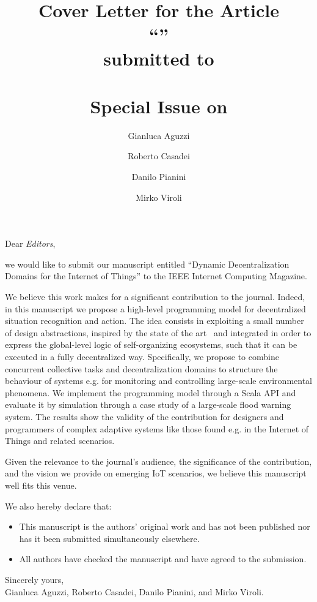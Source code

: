 \documentclass{article}
\title{Cover Letter for the Article\\
\textbf{``\theTitle''}
\\
submitted to
\\
\textbf{\thePublisher{} \theJournal{}\\ Special Issue on \theSI{}}}
\author{Gianluca Aguzzi \and Roberto Casadei \and Danilo Pianini \and Mirko Viroli}
\newcommand{\theTitle}{Dynamic Decentralization Domains for the Internet of Things}
\newcommand{\thePublisher}{IEEE}
\newcommand{\theJournal}{Internet Computing}
\begin{document}
\maketitle

Dear \emph{Editors},

we would like to submit our manuscript entitled ``\theTitle{}''
to the \thePublisher{} \theJournal{} Magazine.

We believe this work makes for a significant contribution to the journal. 
%
Indeed,
 in this manuscript 
 we propose a high-level programming model
 for decentralized situation recognition and action.
%
The idea consists 
 in exploiting a small number of 
 design abstractions,
 inspired by the state of the art~\cite{DBLP:journals/computer/BealPV15,DBLP:journals/fgcs/PianiniCVN21,DBLP:journals/eaai/CasadeiVAPD21,DBLP:journals/tetc/ScekicSVRTMD20,DBLP:journals/computer/BuresPKTH16,DBLP:journals/csur/MottolaP11}
 and integrated in order to express the global-level logic
 of self-organizing ecosystems, such that it can be executed in a fully decentralized way.
%
Specifically, we propose to combine concurrent collective tasks
 and decentralization domains
 to structure 
 the behaviour
 of systems
 e.g. for 
 monitoring and controlling
 large-scale environmental phenomena.
%
We implement the programming model 
 through a Scala API
 and evaluate it by simulation
 through a case study 
 of a large-scale flood warning system.
%
The results show the validity of the contribution for 
 designers and programmers
 of complex adaptive systems
 like those found e.g. in the Internet of Things and related scenarios.

Given the relevance to the journal's audience, 
 the significance of the contribution,
 and the vision we provide on emerging IoT scenarios,
 we believe this manuscript
 well fits this venue.

We also hereby declare that:
%
\begin{itemize}
\item This manuscript is the authors' original work and has not been published nor has it been submitted simultaneously elsewhere.
\item All authors have checked the manuscript and have agreed to the submission. 
\end{itemize}

Sincerely yours,\\
Gianluca Aguzzi, Roberto Casadei, Danilo Pianini, and Mirko Viroli.



\end{document}

